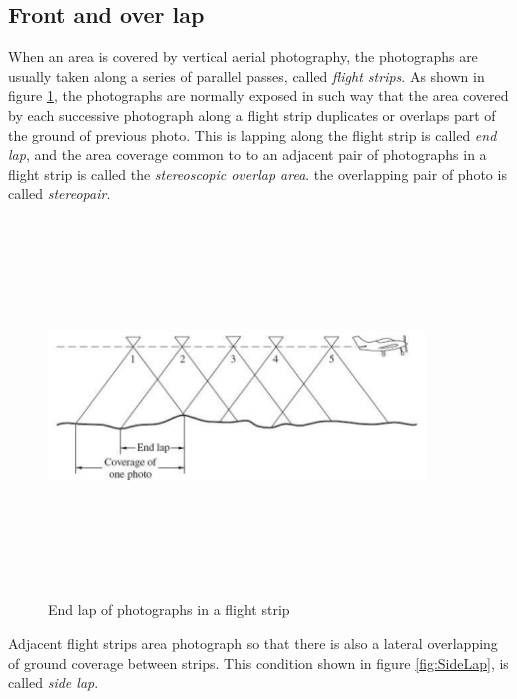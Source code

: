 \subsection{Front and over lap}
When an area is covered by vertical aerial photography, the photographs are usually taken along a series of parallel passes, called \textit{flight strips}. As shown in figure \ref{fig:EndLap}, the photographs are normally exposed in such way that the area covered by each successive photograph along a flight strip duplicates or overlaps part of the ground of previous photo. This is lapping along the flight strip is called \textit{end lap}, and the area coverage common to to an adjacent pair of photographs in a flight strip is called the \textit{stereoscopic overlap area}. the overlapping pair of photo is called \textit{stereopair}\cite{elements_photogrammetry}.
\begin{figure}[H]
\centering
\includegraphics[width=10cm,height=10cm,keepaspectratio]{imagenes/EndLap.PNG}
\caption{End lap of photographs in a flight strip}
\label{fig:EndLap}
\end{figure}
Adjacent flight strips area photograph so that there is also a lateral overlapping of ground coverage between strips. This condition shown in figure \ref{fig:SideLap}, is called \textit{side lap}\cite{elements_photogrammetry}.

